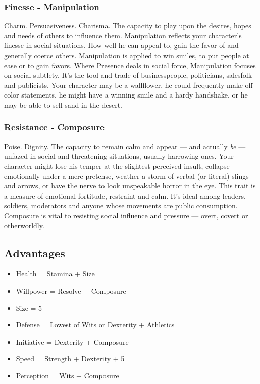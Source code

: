 \documentclass["../Misguided by Starlight.tex"]{subfiles}
\begin{document}
\subsubsection{Finesse - Manipulation}
Charm. Persuasiveness. Charisma. The capacity to play upon the desires, hopes and needs of others to influence them. Manipulation reflects your character's finesse in social situations. How well he can appeal to, gain the favor of and generally coerce others. Manipulation is applied to win smiles, to put people at ease or to gain favors. Where Presence deals in social force, Manipulation focuses on social subtlety. It's the tool and trade of businesspeople, politicians, salesfolk and publicists. Your character may be a wallflower, he could frequently make off-color statements, he might have a winning smile and a hardy handshake, or he may be able to sell sand in the desert.

\subsubsection{Resistance - Composure}
Poise. Dignity. The capacity to remain calm and appear --- and actually \emph{be} --- unfazed in social and threatening situations, usually harrowing ones. Your character might lose his temper at the slightest perceived insult, collapse emotionally under a mere pretense, weather a storm of verbal (or literal) slings and arrows, or have the nerve to look unspeakable horror in the eye. This trait is a measure of emotional fortitude, restraint and calm. It's ideal among leaders, soldiers, moderators and anyone whose movements are public consumption. Composure is vital to resisting social influence and pressure --- overt, covert or otherworldly.

\subsection{Advantages}
	\begin{itemize}
		\item Health = Stamina + Size
		\item Willpower = Resolve + Composure
		\item Size = 5
		\item Defense = Lowest of Wits or Dexterity + Athletics
		\item Initiative = Dexterity + Composure
		\item Speed = Strength + Dexterity + 5
		\item Perception = Wits + Composure
	\end{itemize}
\end{document}
